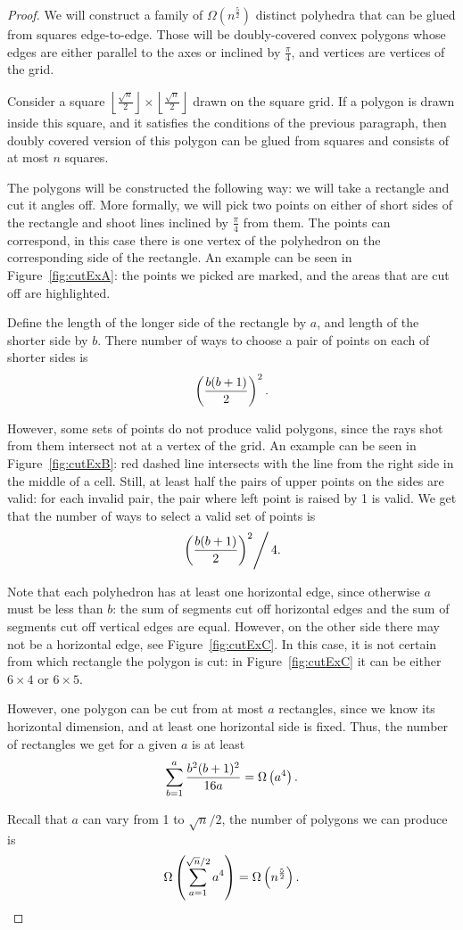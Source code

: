 \documentclass[a4paper,11pt]{article}
\begin{document}
\begin{proof}
We will construct a family of $\Omega \left( n^{\frac52} \right)$ distinct polyhedra that can be glued from squares edge-to-edge. Those will be doubly-covered convex polygons whose edges are either parallel to the axes or inclined by $\frac{\pi}{4}$, and vertices are vertices of the grid.

Consider a square $\left \lfloor \frac{\sqrt n}{2} \right \rfloor \times \left \lfloor \frac{\sqrt n}{2} \right \rfloor$ drawn on the square grid. If a polygon is drawn inside this square, and it satisfies the conditions of the previous paragraph, then doubly covered version of this polygon can be glued from squares and consists of at most $n$ squares.

The polygons will be constructed the following way: we will take a rectangle and cut it angles off. More formally, we will pick two points on either of short sides of the rectangle and shoot lines inclined by $\frac{\pi}{4}$ from them. The points can correspond, in this case there is one vertex of the polyhedron on the corresponding side of the rectangle. An example can be seen in Figure~\ref{fig:cutExA}: the points we picked are marked, and the areas that are cut off are highlighted.



Define the length of the longer side of the rectangle by $a$, and length of the shorter side by $b$. There number of ways to choose a pair of points on each of shorter sides is
\[ \left( \frac{b(b+1)}{2} \right)^2. \]

However, some sets of points do not produce valid polygons, since the rays shot from them intersect not at a vertex of the grid. An example can be seen in Figure~\ref{fig:cutExB}: red dashed line intersects with the line from the right side in the middle of a cell. Still, at least half the pairs of upper points on the sides are valid: for each invalid pair, the pair where left point is raised by 1 is valid. We get that the number of ways to select a valid set of points is
\[ \left. \left( \frac{b(b+1)}{2} \right)^2 \right/ 4 . \]

Note that each polyhedron has at least one horizontal edge, since otherwise $a$ must be less than $b$: the sum of segments cut off horizontal edges and the sum of segments cut off vertical edges are equal. However, on the other side there may not be a horizontal edge, see Figure~\ref{fig:cutExC}. In this case, it is not certain from which rectangle the polygon is cut: in Figure~\ref{fig:cutExC} it can be either $6 \times 4$ or $6 \times 5$.

However, one polygon can be cut from at most $a$ rectangles, since we know its horizontal dimension, and at least one horizontal side is fixed. Thus, the number of rectangles we get for a given $a$ is at least
\[ \sum\limits_{b=1}^a \frac{b^2 (b+1)^2}{16a} = \Omega\left( a^4 \right). \]

Recall that $a$ can vary from 1 to $\sqrt n / 2$, the number of polygons we can produce is
\[ \Omega \left( \sum\limits_{a=1}^{\sqrt n / 2} a^4 \right) = \Omega \left( n^\frac{5}{2} \right). \]

\end{proof}
\end{document}
